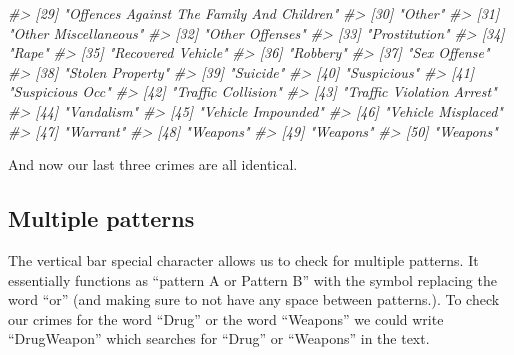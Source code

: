 \documentclass[
  12pt,
  openany]{book}
\newenvironment{Shaded}{\begin{snugshade}}{\end{snugshade}}
\newcommand{\CommentTok}[1]{\textcolor[rgb]{0.37,0.37,0.37}{\textit{#1}}}
\begin{document}
\begin{Shaded}
\begin{Highlighting}[]
\CommentTok{\#\textgreater{} [29] "Offences Against The Family And Children"  }
\CommentTok{\#\textgreater{} [30] "Other"                                     }
\CommentTok{\#\textgreater{} [31] "Other Miscellaneous"                       }
\CommentTok{\#\textgreater{} [32] "Other Offenses"                            }
\CommentTok{\#\textgreater{} [33] "Prostitution"                              }
\CommentTok{\#\textgreater{} [34] "Rape"                                      }
\CommentTok{\#\textgreater{} [35] "Recovered Vehicle"                         }
\CommentTok{\#\textgreater{} [36] "Robbery"                                   }
\CommentTok{\#\textgreater{} [37] "Sex Offense"                               }
\CommentTok{\#\textgreater{} [38] "Stolen Property"                           }
\CommentTok{\#\textgreater{} [39] "Suicide"                                   }
\CommentTok{\#\textgreater{} [40] "Suspicious"                                }
\CommentTok{\#\textgreater{} [41] "Suspicious Occ"                            }
\CommentTok{\#\textgreater{} [42] "Traffic Collision"                         }
\CommentTok{\#\textgreater{} [43] "Traffic Violation Arrest"                  }
\CommentTok{\#\textgreater{} [44] "Vandalism"                                 }
\CommentTok{\#\textgreater{} [45] "Vehicle Impounded"                         }
\CommentTok{\#\textgreater{} [46] "Vehicle Misplaced"                         }
\CommentTok{\#\textgreater{} [47] "Warrant"                                   }
\CommentTok{\#\textgreater{} [48] "Weapons"                                   }
\CommentTok{\#\textgreater{} [49] "Weapons"                                   }
\CommentTok{\#\textgreater{} [50] "Weapons"}
\end{Highlighting}
\end{Shaded}

And now our last three crimes are all identical.

\hypertarget{multiple-patterns}{%
\subsection{\texorpdfstring{Multiple patterns \texttt{\textbar{}}}{Multiple patterns \textbar{}}}\label{multiple-patterns}}

The vertical bar \texttt{\textbar{}} special character allows us to check for multiple patterns. It essentially functions as ``pattern A or Pattern B'' with the \texttt{\textbar{}} symbol replacing the word ``or'' (and making sure to not have any space between patterns.). To check our crimes for the word ``Drug'' or the word ``Weapons'' we could write ``Drug\textbar Weapon'' which searches for ``Drug'' or ``Weapons'' in the text.
\end{document}

